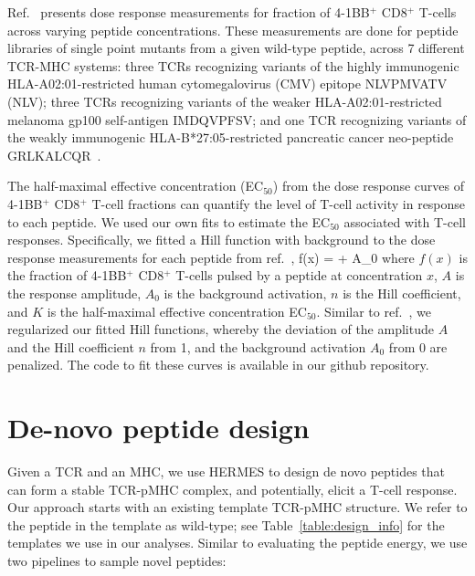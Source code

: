 Ref.~\cite{Luksza2022-gx} presents dose response measurements for fraction of 4-1BB$^+$ CD8$^+$
T-cells across varying peptide concentrations. These measurements are done for peptide libraries of
single point mutants from a given wild-type peptide, across 7 different TCR-MHC systems: three TCRs
recognizing variants of the highly immunogenic HLA-A02:01-restricted human cytomegalovirus (CMV)
epitope NLVPMVATV (NLV); three TCRs recognizing variants of the {weaker} HLA-A02:01-restricted
melanoma gp100 self-antigen IMDQVPFSV; and one TCR recognizing variants of the {weakly immunogenic}
HLA-B*27:05-restricted pancreatic cancer neo-peptide GRLKALCQR~\cite{Luksza2022-gx}.

The half-maximal effective concentration (EC$_{50}$) from the dose response curves of 4-1BB$^+$
CD8$^+$ T-cell fractions can quantify the level of T-cell activity in response to each peptide. We
used our own fits to estimate the EC$_{50}$ associated with T-cell responses. Specifically, we
fitted a Hill function with background to the dose response measurements for each peptide from
ref.~\cite{Luksza2022-gx},
\EQ
f(x) = + A_0
\label{eq:EC50}\EE
where $f(x)$ is the fraction of 4-1BB$^+$ CD8$^+$ T-cells pulsed by a peptide at concentration $x$,
$A$ is the response amplitude, $A_0$ is the background activation, $n$ is the Hill coefficient, and
$K$ is the half-maximal effective concentration EC$_{50}$. Similar to ref.~\cite{Luksza2022-gx}, we
regularized our fitted Hill functions, whereby the deviation of the amplitude $A$ and the Hill
coefficient $n$ from 1, and the background activation $A_0$ from 0 are penalized. The code to fit
these curves is available in our github repository.\\


\section{De-novo peptide design}
\label{sec:peptide_design}

Given a TCR and an MHC, we use HERMES to design de novo peptides that can form a stable TCR-pMHC
complex, and potentially, elicit a T-cell response. Our approach starts with an existing template
TCR-pMHC structure. We refer to the peptide in the template as wild-type; see
Table~\ref{table:design_info} for the templates we use in our analyses. Similar to evaluating the
peptide energy, we use two pipelines to sample novel peptides:

